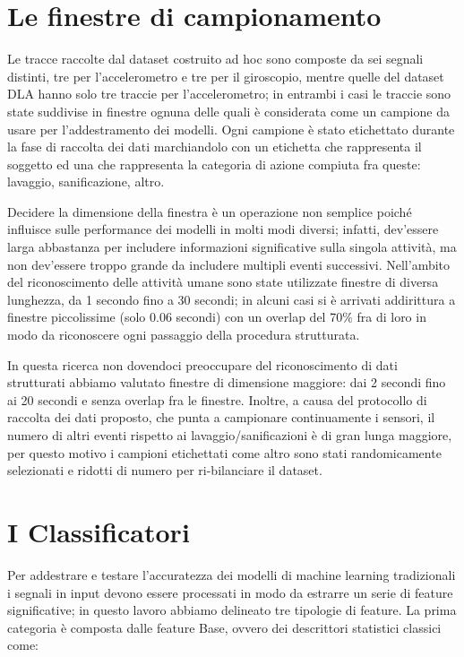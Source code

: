 \section{Le finestre di campionamento}
\label{sec:windows}

Le tracce raccolte dal dataset costruito ad hoc sono composte da sei segnali distinti, tre per l'accelerometro e tre per il giroscopio, mentre quelle del dataset DLA hanno solo tre traccie per l'accelerometro; in entrambi i casi le traccie sono state suddivise in finestre ognuna delle quali è considerata come un campione da usare per l'addestramento dei modelli. Ogni campione è stato etichettato durante la fase di raccolta dei dati marchiandolo con un etichetta che rappresenta il soggetto ed una che rappresenta la categoria di azione compiuta fra queste: lavaggio, sanificazione, altro.

Decidere la dimensione della finestra è un operazione non semplice poiché influisce sulle performance dei modelli in molti modi diversi; infatti, dev'essere larga abbastanza per includere informazioni significative sulla singola attività, ma non dev'essere troppo grande da includere multipli eventi successivi. Nell'ambito del riconoscimento delle attività umane sono state utilizzate finestre di diversa lunghezza, da 1 secondo fino a 30 secondi\cite{cheng2010active}\cite{hassan2018robust}; in alcuni casi si è arrivati addirittura a finestre piccolissime (solo 0.06 secondi) con un overlap del 70\% fra di loro in modo da riconoscere ogni passaggio della procedura strutturata.

In questa ricerca non dovendoci preoccupare del riconoscimento di dati strutturati abbiamo valutato finestre di dimensione maggiore: dai 2 secondi fino ai 20 secondi e senza overlap fra le finestre. Inoltre, a causa del protocollo di raccolta dei dati proposto, che punta a campionare continuamente i sensori, il numero di altri eventi rispetto ai lavaggio/sanificazioni è di gran lunga maggiore, per questo motivo i campioni etichettati come altro sono stati randomicamente selezionati e ridotti di numero per ri-bilanciare il dataset.

\section{I Classificatori}
\label{sec:classifiers}

Per addestrare e testare l'accuratezza dei modelli di machine learning tradizionali i segnali in input devono essere processati in modo da estrarre un serie di feature significative; in questo lavoro abbiamo delineato tre tipologie di feature. La prima categoria è composta dalle feature Base, ovvero dei descrittori statistici classici come:

